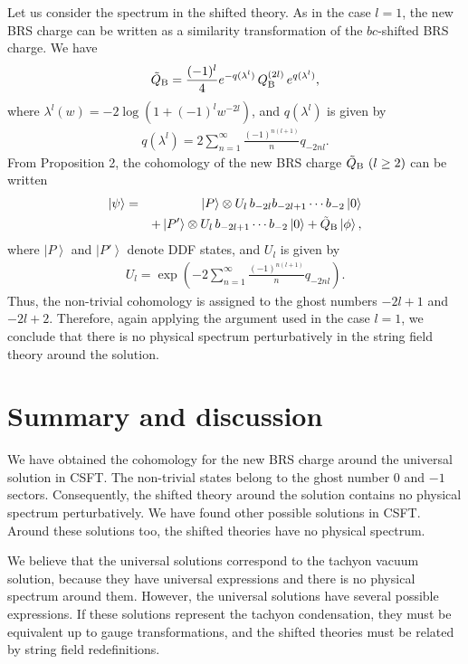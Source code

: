 \documentclass[a4paper,seceq,preprint]{ptptex}
\newcommand{\ket}[1]{\left| #1 \right>}
\newcommand{\Q}{Q_{\rm B}}
\begin{document}
Let us consider the spectrum in the shifted theory.
As in the case $l=1$, the new BRS charge can be written as a 
similarity transformation of the $bc$-shifted BRS charge.
We have
\begin{eqnarray}
 \tilde{Q}_{\rm B}=\frac{(-1)^l}{4} e^{-q(\lambda^l)}\,
 \Q^{(2l)}\, e^{q(\lambda^l)},
\end{eqnarray}
where $\lambda^l(w)=-2\log(1+(-1)^l w^{-2l})$, and $q(\lambda^l)$ is given by
\begin{eqnarray}
 q(\lambda^l)= 2\sum_{n=1}^\infty \frac{(-1)^{n(l+1)}}{n}q_{-2nl}.
\end{eqnarray}
From Proposition 2, the cohomology of the new BRS charge $\tilde{Q}_{\rm
B}\ (l\geq 2)$ can be written 
\begin{eqnarray}
 \ket{\psi}&=&
\ket{P}\otimes U_l\,b_{-2l}b_{-2l+1}\cdots b_{-2}\ket{0}\\
&& +\ket{P'}\otimes U_l\,b_{-2l+1}\cdots b_{-2}\ket{0}
+\tilde{Q}_{\rm B}\ket{\phi},
\end{eqnarray}
where $\ket{P}$ and $\ket{P'}$ denote DDF states, and $U_l$ is given by
\begin{eqnarray}
 U_l =\exp\left(-2\sum_{n=1}^\infty \frac{(-1)^{n(l+1)}}{n}q_{-2nl}\right).
\end{eqnarray}
Thus, the non-trivial cohomology is assigned to the ghost numbers $-2l+1$
and $-2l+2$.
Therefore, again applying the argument used in the case $l=1$, we
conclude that 
there is no physical spectrum perturbatively in the string field theory
around the solution.


\section{Summary and discussion}

We have obtained the cohomology for the new BRS charge around the universal
solution in CSFT. The non-trivial states belong to the ghost number $0$
and $-1$ sectors. Consequently, the shifted theory around the solution
contains no physical spectrum perturbatively. We have found other
possible solutions in CSFT. Around these solutions too,
the shifted theories have no physical spectrum.

We believe that the universal solutions correspond to the tachyon vacuum
solution, because they have universal expressions and there is no
physical spectrum around them. However, the universal solutions have
several possible expressions. If these  
solutions represent the tachyon condensation,
they must be equivalent
up to gauge transformations, and the shifted theories must be
related by string field redefinitions.
\end{document}
